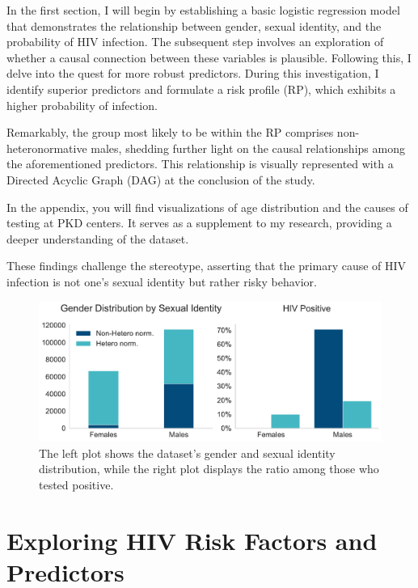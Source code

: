 \documentclass[
  12pt,
  letterpaper,
  DIV=11,
  numbers=noendperiod]{scrartcl}
\begin{document}
In the first section, I will begin by establishing a basic logistic
regression model that demonstrates the relationship between gender,
sexual identity, and the probability of HIV infection. The subsequent
step involves an exploration of whether a causal connection between
these variables is plausible. Following this, I delve into the quest for
more robust predictors. During this investigation, I identify superior
predictors and formulate a risk profile (RP), which exhibits a higher
probability of infection.

Remarkably, the group most likely to be within the RP comprises
non-heteronormative males, shedding further light on the causal
relationships among the aforementioned predictors. This relationship is
visually represented with a Directed Acyclic Graph (DAG) at the
conclusion of the study.

In the appendix, you will find visualizations of age distribution and
the causes of testing at PKD centers. It serves as a supplement to my
research, providing a deeper understanding of the dataset.

These findings challenge the stereotype, asserting that the primary
cause of HIV infection is not one's sexual identity but rather risky
behavior.

\begin{figure}[H]

{\centering \includegraphics{HIVPaper_files/figure-latex/fig-demography-output-1.pdf}

}

\caption{\label{fig-demography}The left plot shows the dataset's gender
and sexual identity distribution, while the right plot displays the
ratio among those who tested positive.}

\end{figure}

\hypertarget{exploring-hiv-risk-factors-and-predictors}{%
\section{Exploring HIV Risk Factors and
Predictors}\label{exploring-hiv-risk-factors-and-predictors}}
\end{document}
